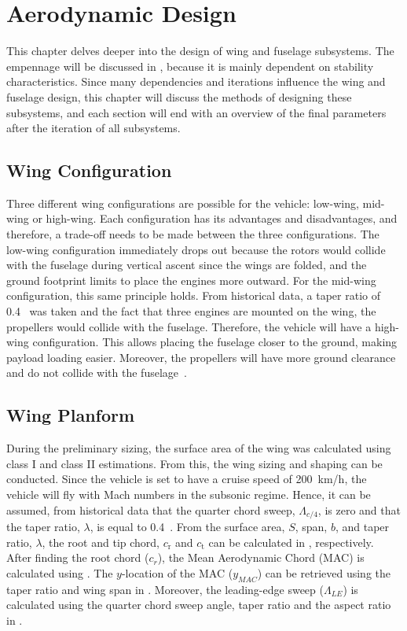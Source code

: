 \chapter{Aerodynamic Design}
\label{ch:AerodynamicDesign}
This chapter delves deeper into the design of wing and fuselage subsystems.
The empennage will be discussed in , because it is mainly dependent on stability characteristics.
Since many dependencies and iterations influence the wing and fuselage design, this chapter will discuss the methods of designing these subsystems, and each section will end with an overview of the final parameters after the iteration of all subsystems.

\section{Wing Configuration}
Three different wing configurations are possible for the vehicle: low-wing, mid-wing or high-wing.
Each configuration has its advantages and disadvantages, and therefore, a trade-off needs to be made between the three configurations.
The low-wing configuration immediately drops out because the rotors would collide with the fuselage during vertical ascent since the wings are folded, and the ground footprint limits to place the engines more outward. 
For the mid-wing configuration, this same principle holds.
From historical data, a taper ratio of \num{0.4}~\cite{ADSEEIslides} was taken and the fact that three engines are mounted on the wing, the propellers would collide with the fuselage.
Therefore, the vehicle will have a high-wing configuration.
This allows placing the fuselage closer to the ground, making payload loading easier.
Moreover, the propellers will have more ground clearance and do not collide with the fuselage~\cite{raymer1992aircraft}.

\section{Wing Planform}
During the preliminary sizing, the surface area of the wing was calculated using class I and class II estimations.
From this, the wing sizing and shaping can be conducted.
Since the vehicle is set to have a cruise speed of \qty{200}{km/h}, the vehicle will fly with Mach numbers in the subsonic regime.
Hence, it can be assumed, from historical data that the quarter chord sweep, $\Lambda_{c/4}$, is zero and that the taper ratio, $ \lambda$, is equal to \num{0.4}~\cite{ADSEEIslides}.
From the surface area, $S$, span, $b$, and taper ratio, $\lambda$, the root and tip chord, $c_\text{r}$ and $c_\text{t}$ can be calculated in , respectively.
After finding the root chord ($c_{r}$), the Mean Aerodynamic Chord (MAC) is calculated using .
The $y$-location of the MAC ($y_{MAC}$) can be retrieved using the taper ratio and wing span in .
Moreover, the leading-edge sweep ($\Lambda_{LE}$) is calculated using the quarter chord sweep angle, taper ratio and the aspect ratio in .


